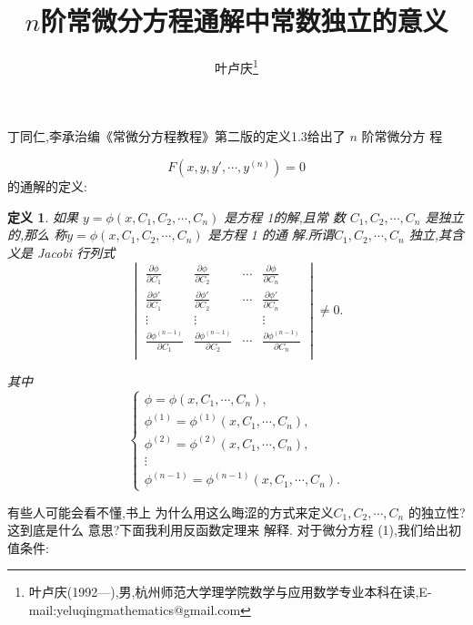 \documentclass[a4paper]{article}
\newtheorem*{defi}{定义}
\newenvironment{definition}
{\bigskip\begin{mdframed}\begin{defi}}
    {\end{defi}\end{mdframed}\bigskip}
\begin{document}
\title{\huge{\bf{$n$阶常微分方程通解中常数独立的意义}}} \author{\small{叶卢庆\footnote{叶卢庆(1992---),男,杭州师范大学理学院数学与应用数学专业本科在读,E-mail:yeluqingmathematics@gmail.com}}}
\maketitle
丁同仁,李承治编《常微分方程教程》第二版的定义1.3给出了 $ n$ 阶常微分方 程

\begin{equation} {\displaystyle F(x,y,y',\cdots,y^{(n)})=0}\end{equation}
的通解的定义:
\begin{definition}
如果 $ y=\phi(x,C_1,C_2,\cdots,C_n)$ 是方程 1的解,且常 数 $ C_1,C_2,\cdots,C_n$ 是独立的,那么 称$ y=\phi(x,C_1,C_2,\cdots,C_n)$ 是方程 1 的通 解.所谓$ C_1,C_2,\cdots,C_n$ 独立,其含义是 Jacobi 行列式 
\begin{equation} {\displaystyle \begin{vmatrix} \frac{\partial \phi}{\partial C_1}&\frac{\partial \phi}{\partial C_2}&\cdots&\frac{\partial\phi}{\partial C_n}\\ \frac{\partial \phi'}{\partial C_1}&\frac{\partial \phi'}{\partial C_2}&\cdots&\frac{\partial \phi'}{\partial C_n}\\ \vdots&\vdots& &\vdots\\ \frac{\partial \phi^{(n-1)}}{\partial C_1}&\frac{\partial \phi^{(n-1)}}{\partial C_2}&\cdots&\frac{\partial \phi^{(n-1)}}{\partial C_n}\\ \end{vmatrix}\neq 0. }\end{equation}

 其中 
\begin{equation} {\displaystyle \begin{cases} \phi=\phi(x,C_1,\cdots,C_n),\\ \phi^{(1)}=\phi^{(1)}(x,C_1,\cdots,C_n),\\ \phi^{(2)}=\phi^{(2)}(x,C_1,\cdots,C_n),\\ \vdots\\ \phi^{(n-1)}=\phi^{(n-1)}(x,C_1,\cdots,C_n). \end{cases}}\end{equation}
\end{definition}

有些人可能会看不懂,书上 为什么用这么晦涩的方式来定义$ C_1,C_2,\cdots,C_n$ 的独立性?这到底是什么 意思?下面我利用反函数定理来 解释.
对于微分方程 (1),我们给出初值条件:
\end{document}
